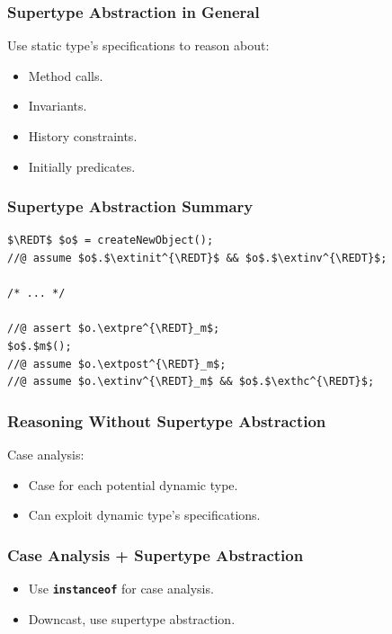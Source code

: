 \begin{frame}
\frametitle{Supertype Abstraction in General}
Use static type's specifications to reason about:
\begin{itemize}
\item
Method calls.
\item
Invariants.
\item
History constraints.
\item
Initially predicates.
\end{itemize}
\end{frame}

\begin{frame}[fragile]
\frametitle{Supertype Abstraction Summary}

\begin{lstlisting}[mathescape=true]
$\REDT$ $o$ = createNewObject();
//@ assume $o$.$\extinit^{\REDT}$ && $o$.$\extinv^{\REDT}$;

/* ... */

//@ assert $o.\extpre^{\REDT}_m$;
$o$.$m$();
//@ assume $o.\extpost^{\REDT}_m$;
//@ assume $o.\extinv^{\REDT}_m$ && $o$.$\exthc^{\REDT}$;
\end{lstlisting}
\end{frame}

\begin{frame}
\frametitle{Reasoning Without Supertype Abstraction}

Case analysis:
\begin{itemize}
\item
Case for each potential dynamic type.

\item
Can exploit dynamic type's specifications.
\end{itemize}
\end{frame}

\begin{frame}
\frametitle{Case Analysis + Supertype Abstraction}
\begin{itemize}
\item
Use \textbf{\texttt{instanceof}} for case analysis.

\item
Downcast, use supertype abstraction.
\end{itemize}
\end{frame}

